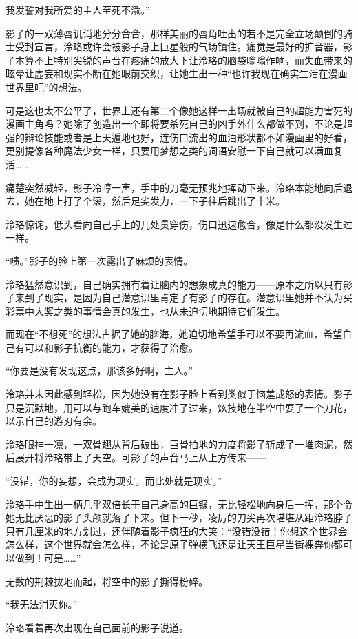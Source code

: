 \documentclass[UTF8, scheme = chinese, openany]{ctexbook}
\begin{document}
我发誓对我所爱的主人至死不渝。”

影子的一双薄唇讥诮地分分合合，那样美丽的唇角吐出的若不是完全立场颠倒的骑士受封宣言，泠珞或许会被影子身上巨星般的气场镇住。痛觉是最好的扩音器，影子本算不上特别尖锐的声音在疼痛的放大下让泠珞的脑袋嗡嗡作响，而失血带来的眩晕让虚妄和现实不断在她眼前交织，让她生出一种“也许我现在确实生活在漫画世界里吧”的想法。

可是这也太不公平了，世界上还有第二个像她这样一出场就被自己的超能力害死的漫画主角吗？她除了创造出一个即将要杀死自己的凶手外什么都做不到，不论是超强的辩论技能或者是上天遁地也好，连伤口流出的血泊形状都不如漫画里的好看，更别提像各种魔法少女一样，只要用梦想之类的词语安慰一下自己就可以满血复活……

痛楚突然减轻，影子冷哼一声，手中的刀毫无预兆地挥动下来。泠珞本能地向后退去，她在地上打了个滚，然后足尖发力，一下子往后跳出了十米。

泠珞惊诧，低头看向自己手上的几处贯穿伤，伤口迅速愈合，像是什么都没发生过一样。

“啧。”影子的脸上第一次露出了麻烦的表情。

泠珞猛然意识到，自己确实拥有着让脑内的想象成真的能力——原本之所以只有影子来到了现实，是因为自己潜意识里肯定了有影子的存在。潜意识里她并不认为买彩票中大奖之类的事情会真的发生，也从未迫切地期待它们发生。

而现在“不想死”的想法占据了她的脑海，她迫切地希望手可以不要再流血，希望自己有可以和影子抗衡的能力，才获得了治愈。

“你要是没有发现这点，那该多好啊，主人。”

泠珞并未因此感到轻松，因为她没有在影子脸上看到类似于恼羞成怒的表情。影子只是沉默地，用可以与跑车媲美的速度冲了过来，炫技地在半空中耍了一个刀花，以示自己的游刃有余。

泠珞眼神一凛，一双骨翅从背后破出，巨骨拍地的力度将影子斩成了一堆肉泥，然后展开将泠珞带上了天空。可影子的声音马上从上方传来——

“没错，你的妄想，会成为现实。而此处就是现实。”

泠珞手中生出一柄几乎双倍长于自己身高的巨镰，无比轻松地向身后一挥，那个令她无比厌恶的影子头颅就落了下来。但下一秒，凌厉的刀尖再次堪堪从距泠珞脖子只有几厘米的地方划过，还伴随着影子疯狂的大笑：“没错没错！你想这个世界会怎么样，这个世界就会怎么样，不论是原子弹横飞还是让天王巨星当街裸奔你都可以做到！可是……”

无数的荆棘拔地而起，将空中的影子撕得粉碎。

“我无法消灭你。”

泠珞看着再次出现在自己面前的影子说道。
\end{document}
